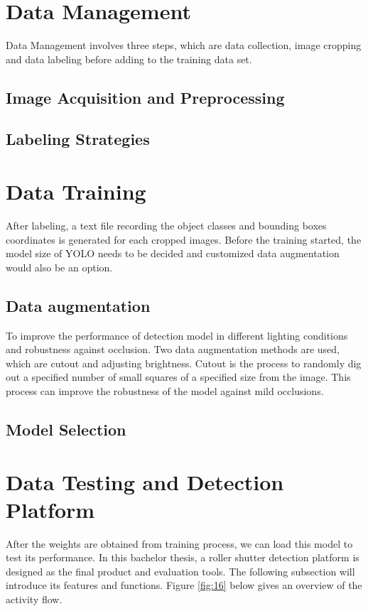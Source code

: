 \section{Data Management}

Data Management involves three steps, which are data collection, image cropping and data labeling before adding to the training data set.

\subsection{Image Acquisition and Preprocessing}

\subsection{Labeling Strategies}


\section{Data Training}

After labeling, a text file recording the object classes and bounding boxes coordinates is generated for each cropped images. Before the training started, the model size of YOLO needs to be decided and customized data augmentation would also be an option.

\subsection{Data augmentation}

To improve the performance of detection model in different lighting conditions and robustness against occlusion. Two data augmentation methods are used, which are cutout and adjusting brightness. Cutout is the process to randomly dig out a specified number of small squares of a specified size from the image. This process can improve the robustness of the model against mild occlusions. 

\subsection{Model Selection}

\section{Data Testing and Detection Platform}

After the weights are obtained from training process, we can load this model to test its performance. In this bachelor thesis, a roller shutter detection platform is designed as the final product and evaluation tools. The following subsection will introduce its features and functions. Figure \ref{fig:16} below gives an overview of the activity flow.

